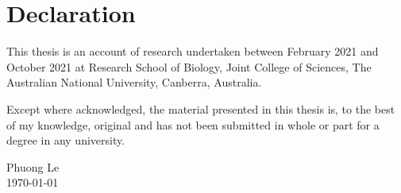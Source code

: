 \chapter*{Declaration}

This thesis is an account of research undertaken between February 2021 and  October 2021 at Research School of Biology, Joint College of Sciences, The Australian National University, Canberra, Australia.

Except where acknowledged, the material presented in this thesis is, to the best of my knowledge, original and has not been submitted in whole or part for a degree in any university.

\vspace{20mm}  %

\large
\begin{flushright}
Phuong Le \\
\today
\end{flushright}
